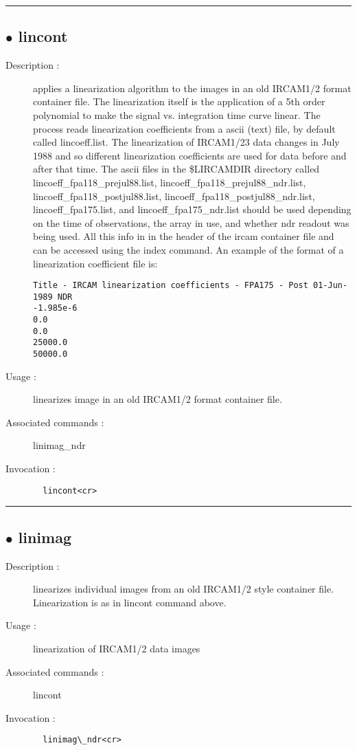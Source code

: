 \hrule \subsection*{$\bullet$ lincont}
\begin{description}
\item[Description :] applies a linearization algorithm to the images in an old
{\sc IRCAM1/2} format container file.  The linearization itself is the
application of a 5th order polynomial to make the signal vs. integration
time curve linear.  The process reads linearization coefficients from a
ascii (text) file, by default called lincoeff.list.  The linearization of
{\sc IRCAM1/2}3 data changes in July 1988 and so different linearization
coefficients are used for data before and after that time.  The ascii
files in the \$LIRCAMDIR directory called lincoeff\_fpa118\_prejul88.list,
lincoeff\_fpa118\_prejul88\_ndr.list, lincoeff\_fpa118\_postjul88.list,
lincoeff\_fpa118\_postjul88\_ndr.list, lincoeff\_fpa175.list, and
lincoeff\_fpa175\_ndr.list should be used depending on the time of
observations, the array in use, and whether ndr readout was being used.
All this info in in the header of the ircam container file and can be
accessed using the index command. An example of the format of a
linearization coefficient file is:

\begin{verbatim}
Title - IRCAM linearization coefficients - FPA175 - Post 01-Jun-1989 NDR
-1.985e-6
0.0
0.0
25000.0
50000.0
\end{verbatim}

\item[Usage :] linearizes image in an old {\sc IRCAM1/2} format container file.
\item[Associated commands :] linimag\_ndr
\item[Invocation :]

\verb+  lincont<cr> +\end{description}

\hrule \subsection*{$\bullet$ linimag}
\begin{description}
\item[Description :] linearizes individual images from an old {\sc IRCAM1/2} style
container file.  Linearization is as in lincont command above.
\item[Usage :] linearization of {\sc IRCAM1/2} data images
\item[Associated commands :] lincont
\item[Invocation :]

\verb+  linimag\_ndr<cr> +\end{description}

